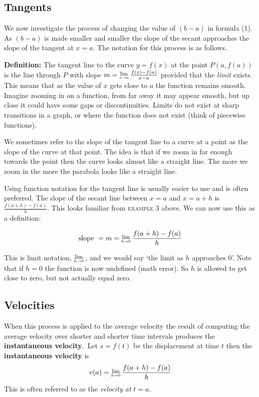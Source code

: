 % 
\subsection*{Tangents}
We now investigate the process of changing the value of $(b -a)$ in formula (1). As $(b -a)$ is made smaller and smaller the slope of the secant approaches the slope of the tangent at $x =a$. The notation for this process is as follows. 

\textbf{Definition:} The tangent line to the curve $y =f (x)$ at the point $P (a ,f (a))$ is the line through $P$ with slope $m =\Lim{x\to a}\frac{f (x) -f (a)}{x -a}$ provided that the \textit{limit} exists. This means that as the value of $x$ gets close to $a$ the function remains smooth. Imagine zooming in on a function, from far away it may appear smooth, but up close it could have some gaps or discontinuities.  Limits do not exist at sharp transitions in a graph, or where the function does not exist (think of piecewise functions). 

We sometimes refer to the slope of the tangent line to a curve at a point as the slope of the curve at that point. The idea is that if we zoom in far enough towards the point then the curve looks almost like a straight line. The more we zoom in the more the parabola looks like a straight line. 

Using function notation for the tangent line is usually easier to use and is often preferred. The slope of the secant line between $x =a$ and $x =a +h$ is $\displaystyle \frac{f (a +h) -f (a)}{h}$. This looks familiar from \textsc{example} 3 above. We can now use this as a definition:

\begin{tcolorbox}
$$\text{slope }=m=\Lim{h\to 0} \frac{f(a+h)-f(a)}{h}$$
\end{tcolorbox}
This is limit notation, $\Lim{h\to 0} $, and we would say `the limit as $h$ approaches $0$'. Note that if $h=0$ the function is now undefined (math error). So $h$ is allowed to get close to zero, but not actually equal zero.

\subsection*{Velocities}
When this process is applied to the average velocity the result of computing the average velocity over shorter and shorter time intervals produces the \textbf{instantaneous velocity}.\ Let $s =f (t)$ be the displacement at time $t$ then the \textbf{instantaneous velocity} is 
$$v (a) =\Lim{h\to 0}\frac{f (a +h) -f (a)}{h}$$
This is often referred to as the \textit{velocity at} $t=a$. 

